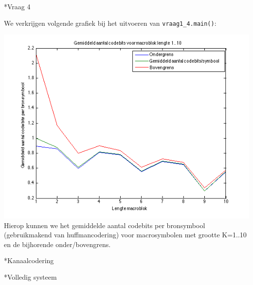 \documentclass[]{article}
\begin{document}
\begin{section}
\begin{subsection}
    \end{subsection}

 \begin{subsection}*{Vraag 4}

        We verkrijgen volgende grafiek bij het uitvoeren van
        \texttt{vraag1\_4.main()}:

       \includegraphics[scale=0.75]{vraag1_4.png} \\
		Hierop kunnen we het gemiddelde aantal codebits per bronsymbool (gebruikmakend van huffmancodering) voor macrosymbolen met grootte K=1..10 en de bijhorende onder/bovengrens.

    \end{subsection}
\end{section}
\begin{section}*{Kanaalcodering}
\end{section}
\begin{section}*{Volledig systeem}
\end{section}
\end{document}
